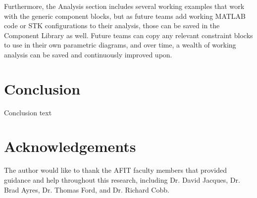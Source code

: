 \documentclass[conference]{joss-pretty}
\begin{document}
Furthermore, the Analysis section includes several working examples that work with the generic component blocks, but as future teams add working MATLAB code or STK configurations to their analysis, those can be saved in the Component Library as well. Future teams can copy any relevant constraint blocks to use in their own parametric diagrams, and over time, a wealth of working analysis can be saved and continuously improved upon.


\section{Conclusion}
Conclusion text


\section{Acknowledgements}
The author would like to thank the AFIT faculty members that provided guidance and help throughout this research, including Dr. David Jacques, Dr. Brad Ayres, Dr. Thomas Ford, and Dr. Richard Cobb.







\end{document}
